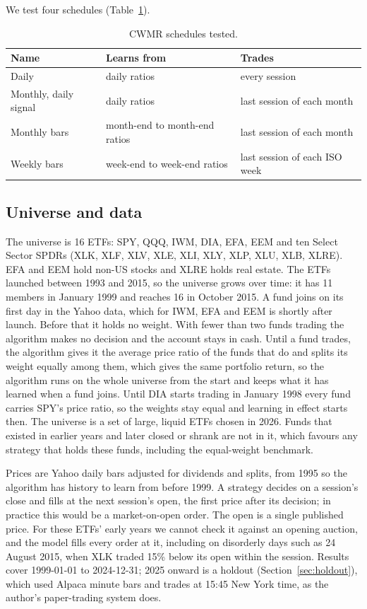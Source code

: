 \documentclass[11pt]{article}
\begin{document}
We test four schedules (Table~\ref{tab:schedules}).

\begin{table}[ht]
\centering
\caption{CWMR schedules tested.}\label{tab:schedules}
\begin{tabular}{lll}
\toprule
Name & Learns from & Trades \\
\midrule
Daily & daily ratios & every session \\
Monthly, daily signal & daily ratios & last session of each month \\
Monthly bars & month-end to month-end ratios & last session of each month \\
Weekly bars & week-end to week-end ratios & last session of each ISO week \\
\bottomrule
\end{tabular}
\end{table}

\subsection{Universe and data}

The universe is 16 ETFs: SPY, QQQ, IWM, DIA, EFA, EEM and ten Select Sector SPDRs (XLK, XLF,
XLV, XLE, XLI, XLY, XLP, XLU, XLB, XLRE). EFA and EEM hold non-US stocks and XLRE holds real
estate. The ETFs launched between 1993 and 2015, so the universe grows over time: it has 11
members in January 1999 and reaches 16 in October 2015. A fund joins on its first day in the
Yahoo data, which for IWM, EFA and EEM is shortly after launch. Before that it holds no
weight. With fewer than two funds trading the algorithm makes no decision and the account stays
in cash. Until a fund trades, the algorithm gives it the average price
ratio of the funds that do and splits its weight equally among them, which gives the same
portfolio return, so the algorithm runs on the whole universe from the start and keeps what it
has learned when a fund joins. Until DIA starts trading in January 1998 every fund carries
SPY's price ratio, so the weights stay equal and learning in effect starts then. The universe is a set of large, liquid ETFs chosen in 2026. Funds
that existed in earlier years and later closed or shrank are not in it, which favours any strategy
that holds these funds, including the equal-weight benchmark.

Prices are Yahoo daily bars adjusted for dividends and splits, from 1995 so the algorithm has
history to learn from before 1999. A strategy decides on a session's close and fills at the next
session's open, the first price after its decision; in practice this would be a market-on-open
order. The open is a single published price. For these ETFs' early years we cannot check it
against an opening auction, and the model fills every order at it, including on disorderly days
such as 24 August 2015, when XLK traded 15\% below its open within the session. Results cover 1999-01-01 to 2024-12-31;
2025 onward is a holdout (Section~\ref{sec:holdout}), which used Alpaca minute bars and trades
at 15:45 New York time, as the author's paper-trading system does.
\end{document}
